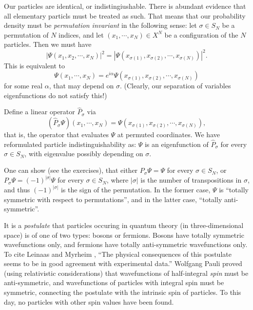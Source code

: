 \documentclass{report}
\theoremstyle{plain}
\theoremstyle{definition}
\begin{document}
Our particles are identical, or indistingiushable. There is abundant
evidence that all elementary particls must be treated as such. That
means that our probability density must be \emph{permutation invariant} in
the following sense: let $\sigma \in S_N$ be a permutation of $N$
indices, and let $(x_1,\cdots,x_N)\in X^N$ be a configuration of the
$N$ particles. Then we must have
\begin{equation}
  |\Psi(x_1,x_2,\cdots,x_N)|^2 = |\Psi(x_{\sigma(1)}, x_{\sigma(2)},\cdots,
  x_{\sigma(N)})|^2.
\end{equation}
This is equivalent to
\begin{equation}
  \Psi(x_1,\cdots,x_N) = e^{i\alpha} \Psi(x_{\sigma(1)}, x_{\sigma(2)},\cdots,
  x_{\sigma(N)})
\end{equation}
for some real $\alpha$, that may depend on $\sigma$. (Clearly, our
separation of variables eigenfunctions do not satisfy this!)

Define a linear operator $\hat{P}_\sigma$ via
\begin{equation}
  (\hat{P}_\sigma\Psi)(x_1,\cdots,x_N) = \Psi(x_{\sigma(1)}, x_{\sigma(2)},\cdots,
  x_{\sigma(N)}),
\end{equation}
that is, the operator that evaluates $\Psi$ at permuted
coordinates. We have reformulated particle indistinguishability as:
$\Psi$ is an eigenfunction of $\hat{P}_\sigma$ for every $\sigma\in
S_N$, with eigenvalue possibly depending on $\sigma$.

One can show (see the exercises), that either $P_\sigma \Psi = \Psi$ for every $\sigma\in
S_N$, or $P_\sigma\Psi = (-1)^{|\sigma|}\Psi$ for every $\sigma\in
S_N$, where $|\sigma|$ is the number of transpositions in $\sigma$,
and thus $(-1)^{|\sigma|}$ is the sign of the permutation. In the
former case, $\Psi$ is ``totally symmetric with respect to
permutations'', and in the latter case, ``totally anti-symmetric''.

It is a \emph{postulate} that particles occuring in quantum theory (in
three-dimensional space) is of one of two types: bosons or
fermions. Bosons have totally symmetric wavefunctions only, and
fermions have totally anti-symmetric wavefunctions only. To cite
Leinaas and Myrheim \cite{Leinaas1977}, ``The physical consequences of
this postulate seems to be in good agreement with experimental data.''
Wolfgang Pauli proved (using relativistic considerations) that
wavefunctions of half-integral \emph{spin} must be anti-symmetric, and
wavefunctions of particles with integral spin must be symmetric,
connecting the postulate with the intrinsic spin of particles. To this
day, no particles with other spin values have been found.
\end{document}

